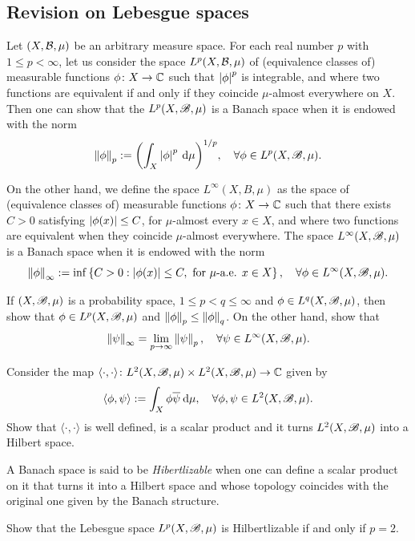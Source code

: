 \subsection{Revision on Lebesgue spaces}\label{sec:revision-Lebesgue-spaces}

Let $(X,\mathcal{B},\mu)$ be an arbitrary measure space. For each real number $p$ with $1\leq p<\infty$, let us consider the space $L^{p}(X,\mathcal{B},\mu)$ of (equivalence classes of) measurable functions $\phi\colon X\to\mathbb{C}$ such that $\left\lvert{\phi}\right\rvert^{p}$ is integrable, and where two functions are equivalent if and only if they coincide $\mu$-almost everywhere on $X$. Then one can show that the $L^{p}(X,\mathscr{B},\mu)$ is a Banach space when it is endowed with the norm
\begin{displaymath}
  \left\|{\phi}\right\|_{p}:= {\left(\int_{X}\left\lvert{\phi}\right\rvert^{p}\:\mathrm{d}\mu\right)}^{1/p},\quad\forall \phi\in L^{p}(X,\mathscr{B},\mu).
\end{displaymath}

On the other hand, we define the space $L^{\infty}(X,B,\mu)$ as the space of (equivalence classes of) measurable functions $\phi\colon X\to\mathbb{C}$ such that there exists $C>0$ satisfying $\left\lvert{\phi(x)}\right\rvert\leq C$, for $\mu$-almost every $x\in X$, and where two functions are equivalent when they coincide $\mu$-almost everywhere. The space $L^{\infty}(X,\mathscr{B},\mu)$ is a Banach space when it is endowed with the norm
\begin{displaymath}
  \left\|{\phi}\right\|_{\infty}:=\inf\left\{C>0 : \left\lvert{\phi(x)}\right\rvert\leq C,\ \text{for }\mu\text{-a.e. } x\in X\right\}, \quad\forall \phi\in L^{\infty}(X,\mathscr{B},\mu).
\end{displaymath}

\begin{exercise}
  If $(X,\mathscr{B},\mu)$ is a probability space, $1\leq p<q\leq \infty$ and $\phi\in L^{q}(X,\mathscr{B},\mu)$, then show that $\phi\in L^{p}(X,\mathscr{B},\mu)$ and $\left\|{\phi}\right\|_{p}\leq \left\|{\phi}\right\|_{q}$. On the other hand, show that
  \begin{displaymath}
    \left\|{\psi}\right\|_{\infty}=\lim_{p\to\infty}\left\|{\psi}\right\|_{p}, \quad\forall \psi\in L^{\infty}(X,\mathscr{B},\mu).
  \end{displaymath}
\end{exercise}

\begin{exercise}
  Consider the map $\langle\cdot,\cdot\rangle\colon L^{2}(X,\mathscr{B},\mu)\times L^{2}(X,\mathscr{B},\mu)\to\mathbb{C}$ given by
  \begin{displaymath}
    \langle\phi,\psi\rangle :=\int_{X}\phi\overline{\psi}\:\mathrm{d}\mu,\quad\forall \phi,\psi\in L^{2}(X,\mathscr{B},\mu).
  \end{displaymath}
  Show that $\langle\cdot,\cdot\rangle$ is well defined, is a scalar product and it turns $L^{2}(X,\mathscr{B},\mu)$ into a Hilbert space.

  A Banach space is said to be \emph{Hibertlizable} when one can define a scalar product on it that turns it into a Hilbert space and whose topology coincides with the original one given by the Banach structure.

  Show that the Lebesgue space $L^{p}(X,\mathscr{B},\mu)$ is Hilbertlizable if and only if $p=2$.
\end{exercise}

